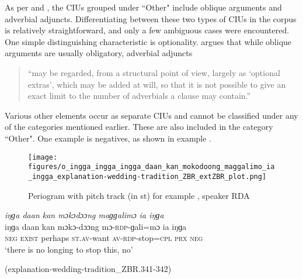 As per \citet[72]{Tao_1996} and \citet[150]{Wouk_2008}, the CIUs grouped under ``Other" include oblique arguments and adverbial adjuncts. Differentiating between these two types of CIUs in the corpus is relatively straightforward, and only a few ambiguous cases were encountered. One simple distinguishing characteristic is optionality. \citet[50]{quirk1985comprehensive} argues that while oblique arguments are usually obligatory, adverbial adjuncts 

\begin{quote}
    ``may be regarded, from a structural point of view, largely as ‘optional extras’, which may be added at will, so that it is not possible to give an exact limit to the number of adverbials a clause may contain.'' 
\end{quote}


Various other elements occur as separate CIUs and cannot be classified under any of the categories mentioned earlier. These are also included in the category ``Other". One example is negatives, as shown in example .



\begin{figure}
	\texttt{[image: figures/o\_ingga\_ingga\_ingga\_daan\_kan\_mokodoong\_maggalimo\_ia\_ingga\_explanation-wedding-tradition\_ZBR\_extZBR\_plot.png]}
	\caption{Periogram with pitch track (in st) for example , speaker RDA}
	\label{pitch:ex}
\end{figure}




\ea
\label{ex:}


{
	\ex
	\label{ex:ingga daan kan mokodoong maggalimo ia ingga}
	\textit{iŋɡa daan kan mɔkɔdɔɔng maɡɡalimɔ ia iŋɡa} \\
	\gll  iŋɡa daan kan mɔkɔ-dɔɔng mɔ-\textsc{rdp}-ɡali=mɔ ia iŋɡa \\
	\textsc{neg} \textsc{exist} perhaps \textsc{st.av-}want \textsc{av-rdp-}stop=\textsc{cpl} \textsc{prx} \textsc{neg}\\
	\glt `there is no longing to stop this, no'
	\begin{flushright}(explanation-wedding-tradition\_ZBR.341-342)
		\end{flushright}
}
\z
\z	

